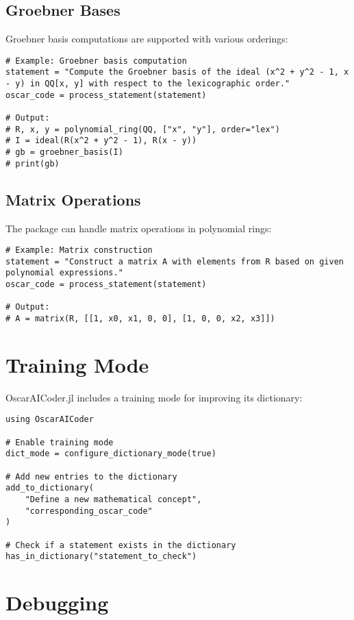 \documentclass[11pt,a4paper]{article}
\begin{document}
\subsection{Groebner Bases}

Groebner basis computations are supported with various orderings:

\begin{lstlisting}
# Example: Groebner basis computation
statement = "Compute the Groebner basis of the ideal (x^2 + y^2 - 1, x - y) in QQ[x, y] with respect to the lexicographic order."
oscar_code = process_statement(statement)

# Output:
# R, x, y = polynomial_ring(QQ, ["x", "y"], order="lex")
# I = ideal(R(x^2 + y^2 - 1), R(x - y))
# gb = groebner_basis(I)
# print(gb)
\end{lstlisting}

\subsection{Matrix Operations}

The package can handle matrix operations in polynomial rings:

\begin{lstlisting}
# Example: Matrix construction
statement = "Construct a matrix A with elements from R based on given polynomial expressions."
oscar_code = process_statement(statement)

# Output:
# A = matrix(R, [[1, x0, x1, 0, 0], [1, 0, 0, x2, x3]])
\end{lstlisting}

\section{Training Mode}

OscarAICoder.jl includes a training mode for improving its dictionary:

\begin{lstlisting}
using OscarAICoder

# Enable training mode
dict_mode = configure_dictionary_mode(true)

# Add new entries to the dictionary
add_to_dictionary(
    "Define a new mathematical concept",
    "corresponding_oscar_code"
)

# Check if a statement exists in the dictionary
has_in_dictionary("statement_to_check")
\end{lstlisting}

\section{Debugging}
\end{document}
